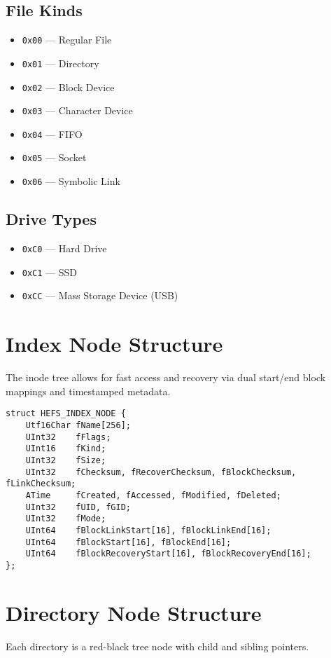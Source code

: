 \documentclass{article}
\begin{document}
\subsection*{File Kinds}
\begin{itemize}[label=--]
    \item \verb|0x00| — Regular File
    \item \verb|0x01| — Directory
    \item \verb|0x02| — Block Device
    \item \verb|0x03| — Character Device
    \item \verb|0x04| — FIFO
    \item \verb|0x05| — Socket
    \item \verb|0x06| — Symbolic Link
\end{itemize}

\subsection*{Drive Types}
\begin{itemize}[label=--]
    \item \verb|0xC0| — Hard Drive
    \item \verb|0xC1| — SSD
    \item \verb|0xCC| — Mass Storage Device (USB)
\end{itemize}

\section{Index Node Structure}
The inode tree allows for fast access and recovery via dual start/end block mappings and timestamped metadata.

\begin{lstlisting}[style=cstyle, caption={HEFS\_INDEX\_NODE structure}]
struct HEFS_INDEX_NODE {
    Utf16Char fName[256];
    UInt32    fFlags;
    UInt16    fKind;
    UInt32    fSize;
    UInt32    fChecksum, fRecoverChecksum, fBlockChecksum, fLinkChecksum;
    ATime     fCreated, fAccessed, fModified, fDeleted;
    UInt32    fUID, fGID;
    UInt32    fMode;
    UInt64    fBlockLinkStart[16], fBlockLinkEnd[16];
    UInt64    fBlockStart[16], fBlockEnd[16];
    UInt64    fBlockRecoveryStart[16], fBlockRecoveryEnd[16];
};
\end{lstlisting}

\section{Directory Node Structure}
Each directory is a red-black tree node with child and sibling pointers.
\end{document}
